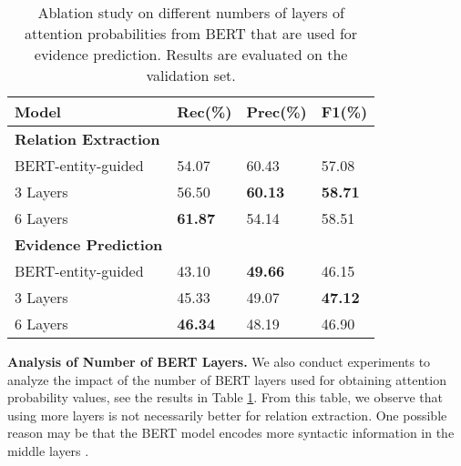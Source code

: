 \documentclass[11pt,a4paper]{article}
\begin{document}
\begin{table}[!h]
\begin{small}
\begin{center}
\begin{tabular}{|l|l|l|l|}
\hline \bf Model & \bf Rec(\%) & \bf Prec(\%) & \bf F1(\%)\\ \hline
\bf Relation Extraction & & & \\ \hline 
BERT-entity-guided  & 54.07 & 60.43 & 57.08\\ 3 Layers  & 56.50 & \bf 60.13 & \bf 58.71\\ 
6 Layers  &  \bf 61.87 &  54.14 &  58.51\\ \hline
\bf Evidence Prediction & & & \\ \hline
BERT-entity-guided  & 43.10 & \bf 49.66 & 46.15\\ 3 Layers  & 45.33 & 49.07 & \bf 47.12\\
6 Layers  & \bf 46.34 & 48.19 & 46.90\\
\hline
\end{tabular}
\end{center}
\end{small}
\caption{\label{font-table} Ablation study on different numbers of layers of attention probabilities from BERT that are used for evidence prediction. Results are evaluated on the validation set.
}
\label{table:ablation_layers}
\end{table}

\noindent\textbf{Analysis of Number of BERT Layers.} 
We also conduct experiments to analyze the impact of the number of BERT layers used for obtaining attention probability values, see the results in Table \ref{table:ablation_layers}.
From this table, we observe that using more layers is not necessarily better for relation extraction. One possible reason may be that the BERT model encodes more syntactic information in the middle layers \cite{Clark2019WhatDB}.
\end{document}
